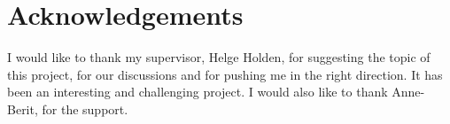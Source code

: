 \chapter*{Acknowledgements}
I would like to thank my supervisor, Helge Holden, for suggesting the topic of this project, for our discussions and for pushing me in the right direction. It has been an interesting and challenging project. I would also like to thank Anne-Berit, for the support. 
